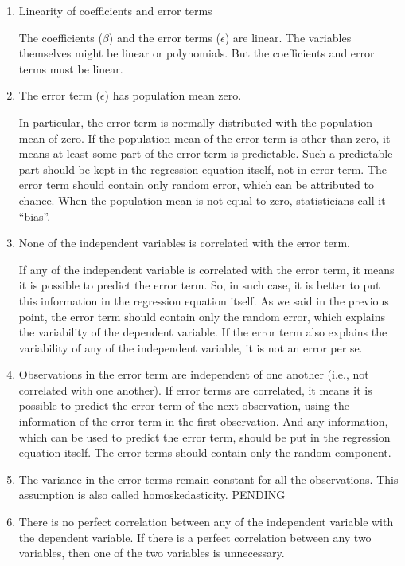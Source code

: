 \documentclass[
  letterpaper,
  paper =a4,
  twoside,
  openright,
  headsepline,
  footsepline,
  listof = totocnumbered,
  chapterprefix = true,
  firstiscover]{scrbook}
\begin{document}
\begin{enumerate}
\def\labelenumi{\arabic{enumi}.}
\item
  Linearity of coefficients and error terms

  The coefficients (\(\beta\)) and the error terms (\(\epsilon\)) are
  linear. The variables themselves might be linear or polynomials. But
  the coefficients and error terms must be linear.
\item
  The error term (\(\epsilon\)) has population mean zero.

  In particular, the error term is normally distributed with the
  population mean of zero. If the population mean of the error term is
  other than zero, it means at least some part of the error term is
  predictable. Such a predictable part should be kept in the regression
  equation itself, not in error term. The error term should contain only
  random error, which can be attributed to chance. When the population
  mean is not equal to zero, statisticians call it ``bias''.
\item
  None of the independent variables is correlated with the error term.

  If any of the independent variable is correlated with the error term,
  it means it is possible to predict the error term. So, in such case,
  it is better to put this information in the regression equation
  itself. As we said in the previous point, the error term should
  contain only the random error, which explains the variability of the
  dependent variable. If the error term also explains the variability of
  any of the independent variable, it is not an error per se.
\item
  Observations in the error term are independent of one another (i.e.,
  not correlated with one another). If error terms are correlated, it
  means it is possible to predict the error term of the next
  observation, using the information of the error term in the first
  observation. And any information, which can be used to predict the
  error term, should be put in the regression equation itself. The error
  terms should contain only the random component.
\item
  The variance in the error terms remain constant for all the
  observations. This assumption is also called homoskedasticity. PENDING
\item
  There is no perfect correlation between any of the independent
  variable with the dependent variable. If there is a perfect
  correlation between any two variables, then one of the two variables
  is unnecessary.
\end{enumerate}
\end{document}
